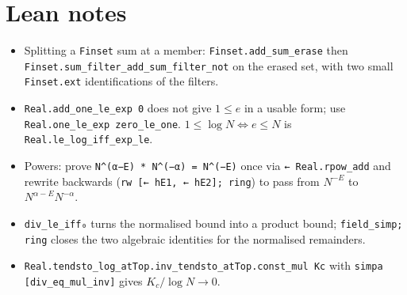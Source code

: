 \documentclass[11pt]{article}
\begin{document}
\section{Lean notes}
\begin{itemize}
\item Splitting a \texttt{Finset} sum at a member: \texttt{Finset.add\_sum\_erase} then
\texttt{Finset.sum\_filter\_add\_sum\_filter\_not} on the erased set, with two small
\texttt{Finset.ext} identifications of the filters.
\item \texttt{Real.add\_one\_le\_exp 0} does not give $1\le e$ in a usable form; use
\texttt{Real.one\_le\_exp zero\_le\_one}. $1\le\log N\iff e\le N$ is
\texttt{Real.le\_log\_iff\_exp\_le}.
\item Powers: prove \texttt{N\^{}(α−E) * N\^{}(−α) = N\^{}(−E)} once via \texttt{← Real.rpow\_add} and
rewrite backwards (\texttt{rw [← hE1, ← hE2]; ring}) to pass from $N^{-E}$ to $N^{\alpha-E}N^{-\alpha}$.
\item \texttt{div\_le\_iff₀} turns the normalised bound into a product bound; \texttt{field\_simp; ring}
closes the two algebraic identities for the normalised remainders.
\item \texttt{Real.tendsto\_log\_atTop.inv\_tendsto\_atTop.const\_mul Kc} with
\texttt{simpa [div\_eq\_mul\_inv]} gives $K_c/\log N\to0$.
\end{itemize}
\end{document}
